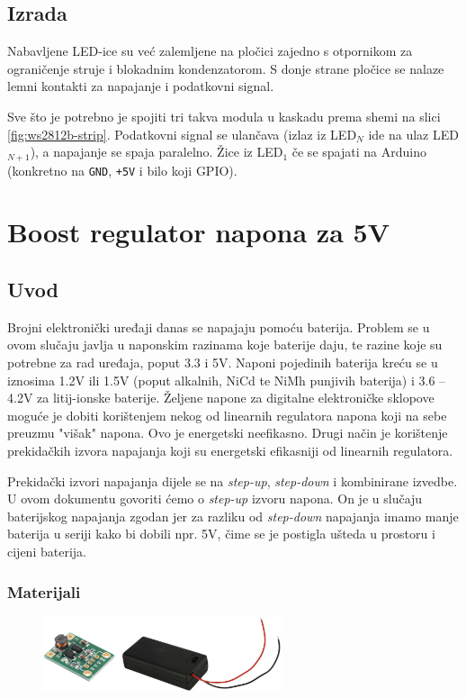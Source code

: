 \documentclass[times, utf8, zavrsni, numeric, sort]{fer}
\begin{document}
\section{Izrada}

Nabavljene LED-ice su već zalemljene na pločici zajedno s otpornikom za ograničenje struje i blokadnim kondenzatorom. S donje strane pločice se nalaze lemni kontakti za napajanje i podatkovni signal.

Sve što je potrebno je spojiti tri takva modula u kaskadu prema shemi na slici \ref{fig:ws2812b-strip}. Podatkovni signal se ulančava (izlaz iz LED$_N$ ide na ulaz LED$_{N+1}$), a napajanje se spaja paralelno. Žice iz LED$_1$ če se spajati na Arduino (konkretno na \texttt{GND}, \texttt{+5V} i bilo koji GPIO).


\chapter{Boost regulator napona za 5V}
\section{Uvod}

Brojni elektronički uređaji danas se napajaju pomoću baterija. Problem se u ovom slučaju javlja u naponskim razinama koje baterije daju, te razine koje su potrebne za rad uređaja, poput 3.3 i 5V. Naponi pojedinih baterija kreću se u iznosima 1.2V ili 1.5V (poput alkalnih, NiCd te NiMh punjivih baterija) i 3.6 -- 4.2V za litij-ionske baterije. Željene napone za digitalne elektroničke sklopove moguće je dobiti korištenjem nekog od linearnih regulatora napona koji na sebe preuzmu "višak" napona. Ovo je energetski neefikasno. Drugi način je korištenje prekidačkih izvora napajanja koji su energetski efikasniji od linearnih regulatora.

Prekidački izvori napajanja dijele se na \textit{step-up}, \textit{step-down} i kombinirane izvedbe. U ovom dokumentu govoriti ćemo o \textit{step-up} izvoru napona. On je u slučaju baterijskog napajanja zgodan jer za razliku od \textit{step-down} napajanja imamo manje baterija u seriji kako bi dobili npr. 5V, čime se je postigla ušteda u prostoru i cijeni baterija. 

\subsection{Materijali}

\begin{figure}[h!]
	\centering
	\includegraphics[width=7cm]{./Fotke/5V boost/Materijal.jpg}
	\label{fig:slika1}
\end{figure}
\end{document}
